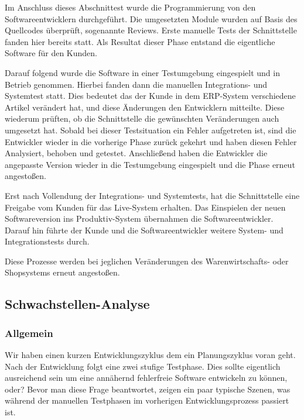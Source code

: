 Im Anschluss dieses Abschnittest wurde die Programmierung von den Softwareentwicklern durchgeführt. Die umgesetzten Module wurden auf Basis des Quellcodes überprüft, sogenannte Reviews. Erste manuelle Tests der Schnittstelle fanden hier bereits statt. Als Resultat dieser Phase entstand die eigentliche Software für den Kunden. 

Darauf folgend wurde die Software in einer Testumgebung eingespielt und in Betrieb genommen. Hierbei fanden dann die manuellen Integrations- und Systemtest statt. Dies bedeutet das der Kunde in dem ERP-System verschiedene Artikel verändert hat, und diese Änderungen den Entwicklern mitteilte. Diese wiederum prüften, ob die Schnittstelle die gewünschten Veränderungen auch umgesetzt hat. Sobald bei dieser Testsituation ein Fehler aufgetreten ist, sind die Entwickler wieder in die vorherige Phase zurück gekehrt und haben diesen Fehler Analysiert, behoben und getestet. Anschließend haben die Entwickler die angepasste Version wieder in die Testumgebung eingespielt und die Phase erneut angestoßen.

Erst nach Vollendung der Integrations- und Systemtests, hat die Schnittstelle eine Freigabe vom Kunden für das Live-System erhalten. Das Einspielen der neuen Softwareversion ins Produktiv-System übernahmen die Softwareentwickler. Darauf hin führte der Kunde und die Softwareentwickler weitere System- und Integrationstests durch.

Diese Prozesse werden bei jeglichen Veränderungen des Warenwirtschafts- oder Shopsystems erneut angestoßen. 

\subsection{Schwachstellen-Analyse}
\subsubsection{Allgemein}
Wir haben einen kurzen Entwicklungszyklus dem ein Planungszyklus voran geht. Nach der Entwicklung folgt eine zwei stufige Testphase. Dies sollte eigentlich ausreichend sein um eine annähernd fehlerfreie Software entwickeln zu können, oder? Bevor man diese Frage beantwortet, zeigen ein paar typische Szenen, was während der manuellen Testphasen im vorherigen Entwicklungsprozess passiert ist.


